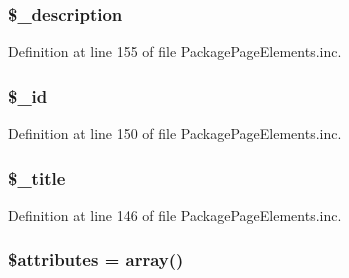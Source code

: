 \hypertarget{classparser_x_m_l_doc_book_tag_a8117a7944266f3283fa6d3526d5b24dc}{
\subsubsection[{\$\-\_\-description}]{\setlength{\rightskip}{0pt plus 5cm}\$\-\_\-description}}\label{classparser_x_m_l_doc_book_tag_a8117a7944266f3283fa6d3526d5b24dc}


\-Definition at line 155 of file \-Package\-Page\-Elements.\-inc.

\hypertarget{classparser_x_m_l_doc_book_tag_a64da16c4a1c7b2dc6784f6ef26341ed7}{
\subsubsection[{\$\-\_\-id}]{\setlength{\rightskip}{0pt plus 5cm}\$\-\_\-id}}\label{classparser_x_m_l_doc_book_tag_a64da16c4a1c7b2dc6784f6ef26341ed7}


\-Definition at line 150 of file \-Package\-Page\-Elements.\-inc.

\hypertarget{classparser_x_m_l_doc_book_tag_a49d523a090a700a0689f154d79932063}{
\subsubsection[{\$\-\_\-title}]{\setlength{\rightskip}{0pt plus 5cm}\$\-\_\-title}}\label{classparser_x_m_l_doc_book_tag_a49d523a090a700a0689f154d79932063}


\-Definition at line 146 of file \-Package\-Page\-Elements.\-inc.

\hypertarget{classparser_x_m_l_doc_book_tag_adc851f7a62250e75df0490c0280aef4c}{
\subsubsection[{\$attributes}]{\setlength{\rightskip}{0pt plus 5cm}\$attributes = array()}}\label{classparser_x_m_l_doc_book_tag_adc851f7a62250e75df0490c0280aef4c}



